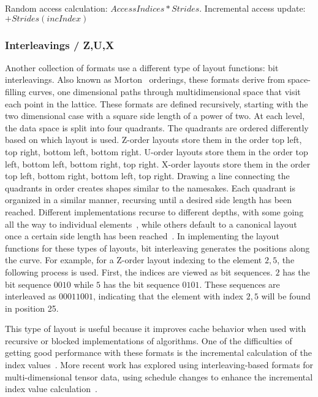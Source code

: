 Random access calculation: $AccessIndices * Strides$. 
Incremental access update: $+Strides(incIndex)$

\subsubsection{Interleavings / Z,U,X}

Another collection of formats use a different type of layout functions: bit interleavings.
Also known as Morton~\cite{morton} orderings, these formats derive from space-filling curves, one dimensional paths through multidimensional space that visit each point in the lattice.
These formats are defined recursively, starting with the two dimensional case with a square side length of a power of two.
At each level, the data space is split into four quadrants.
The quadrants are ordered differently based on which layout is used. 
Z-order layouts store them in the order top left, top right, bottom left, bottom right.
U-order layouts store them in the order top left, bottom left, bottom right, top right.
X-order layouts store them in the order top left, bottom right, bottom left, top right.
Drawing a line connecting the quadrants in order creates shapes similar to the namesakes.
Each quadrant is organized in a similar manner, recursing until a desired side length has been reached. 
Different implementations recurse to different depths, with some going all the way to individual elements~\cite{frens1997auto}, while others default to a canonical layout once a certain side length has been reached~\cite{chatterjee1999recursive}.
In implementing the layout functions for these types of layouts, bit interleaving generates the positions along the curve.
For example, for a Z-order layout indexing to the element $2,5$, the following process is used.
First, the indices are viewed as bit sequences. $2$ has the bit sequence $0010$ while $5$ has the bit sequence $0101$.
These sequences are interleaved as $00011001$, indicating that the element with index $2,5$ will be found in position 25.

This type of layout is useful because it improves cache behavior when used with recursive or blocked implementations of algorithms.
One of the difficulties of getting good performance with these formats is the incremental calculation of the index values~\cite{wise2000ahnentafel,adams2006fast}.
More recent work has explored using interleaving-based formats for multi-dimensional tensor data, using schedule changes to enhance the incremental index value calculation~\cite{pawlowski2019multi}.

